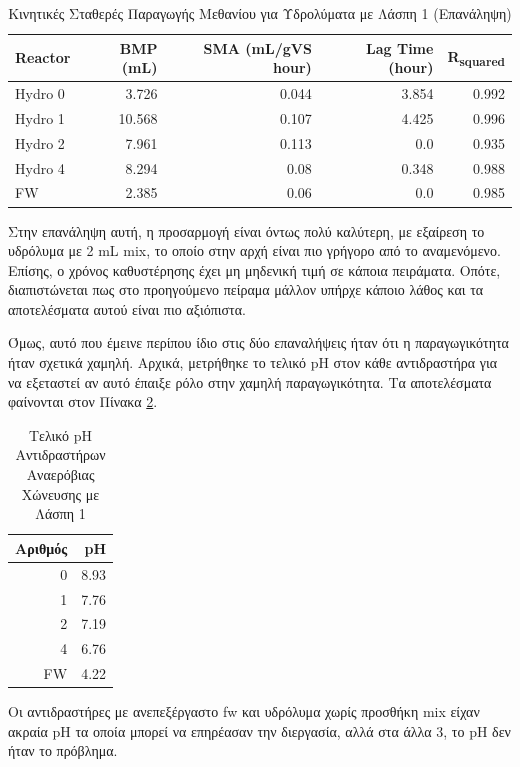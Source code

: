 \documentclass[11pt]{report}
\begin{document}
\begin{enumerate}
\begin{table}[htbp]
\caption{\label{tab:orga464411}Κινητικές Σταθερές Παραγωγής Μεθανίου για Υδρολύματα με Λάσπη 1 (Επανάληψη)}
\centering
\begin{tabular}{lrrrr}
Reactor & BMP (mL) & SMA (mL/gVS hour) & Lag Time (hour) & R\textsubscript{squared}\\[0pt]
\hline
Hydro 0 & 3.726 & 0.044 & 3.854 & 0.992\\[0pt]
Hydro 1 & 10.568 & 0.107 & 4.425 & 0.996\\[0pt]
Hydro 2 & 7.961 & 0.113 & 0.0 & 0.935\\[0pt]
Hydro 4 & 8.294 & 0.08 & 0.348 & 0.988\\[0pt]
FW & 2.385 & 0.06 & 0.0 & 0.985\\[0pt]
\end{tabular}
\end{table}

Στην επανάληψη αυτή, η προσαρμογή είναι όντως πολύ καλύτερη, με εξαίρεση το υδρόλυμα με 2 mL \acrshort{mix}, το οποίο στην αρχή είναι πιο γρήγορο από το αναμενόμενο. Επίσης, ο χρόνος καθυστέρησης έχει μη μηδενική τιμή σε κάποια πειράματα. Οπότε, διαπιστώνεται πως στο προηγούμενο πείραμα μάλλον υπήρχε κάποιο λάθος και τα αποτελέσματα αυτού είναι πιο αξιόπιστα.

Όμως, αυτό που έμεινε περίπου ίδιο στις δύο επαναλήψεις ήταν ότι η παραγωγικότητα ήταν σχετικά χαμηλή. Αρχικά, μετρήθηκε το τελικό pH στον κάθε αντιδραστήρα για να εξεταστεί αν αυτό έπαιξε ρόλο στην χαμηλή παραγωγικότητα. Τα αποτελέσματα φαίνονται στον Πίνακα \ref{tab:org5abb41b}.

\begin{table}[htbp]
\caption{\label{tab:org5abb41b}Τελικό pH Αντιδραστήρων Αναερόβιας Χώνευσης με Λάσπη 1}
\centering
\begin{tabular}{rr}
Αριθμός & pH\\[0pt]
\hline
0 & 8.93\\[0pt]
1 & 7.76\\[0pt]
2 & 7.19\\[0pt]
4 & 6.76\\[0pt]
FW & 4.22\\[0pt]
\end{tabular}
\end{table}

Οι αντιδραστήρες με ανεπεξέργαστο \acrshort{fw} και υδρόλυμα χωρίς προσθήκη \acrshort{mix} είχαν ακραία pH τα οποία μπορεί να επηρέασαν την διεργασία, αλλά στα άλλα 3, το pH δεν ήταν το πρόβλημα.


\end{enumerate}
\end{document}
